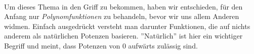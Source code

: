 \\
Um dieses Thema in den Griff zu bekommen, haben wir entschieden, für den Anfang nur \textit{Polynomfunktionen} zu behandeln, bevor wir uns allem Anderen widmen. Einfach ausgedrückt versteht man darunter Funktionen, die auf nichts anderem als natürlichen Potenzen basieren. ''Natürlich'' ist hier ein wichtiger Begriff und meint, dass Potenzen von $0$ aufwärts zulässig sind.
